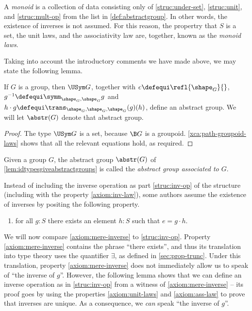 \begin{remark}
  A \emph{monoid} is a collection of data consisting only of \ref{struc:under-set}, \ref{struc:unit}, and \ref{struc:mult-op} from the list in
  \cref{def:abstractgroup}.  In other words, the existence of inverses is not assumed.  For this reason, the propertry that $S$ is a set, the
  unit laws, and the associativity law are, together, known as the \emph{monoid laws}.
\end{remark}

Taking into account the introductory comments we have made above, we may state the following lemma.

\begin{lemma}\label{lem:idtypesgiveabstractgroups}
  If $G$ is a group, then $\USym G$,
  together with $e\defequi\refl{\shape_G}{}$,
  $g^{-1}\defequi\symm_{\shape_G,\shape_G}g$
  and $h \cdot g \defequi \trans_{\shape_G,\shape_G,\shape_G}(g)(h)$, define an abstract group.
  We will let $\abstr(G)$ denote that abstract group.
\end{lemma}

\begin{proof}
  The type $\USym G$ is a set, because $\B G$ is a groupoid.
  \cref{xca:path-groupoid-laws} shows that all the relevant equations hold, as required.
\end{proof}

\begin{definition}\label{def:abstrG}
  Given a group $G$, the abstract group $\abstr(G)$ of \cref{lem:idtypesgiveabstractgroups} is called the \emph{abstract group associated to $G$}.
\end{definition}

\begin{remark}\label{rem:inverses-as-property}
  \makeatletter %
  \renewcommand\p@enumii{}%
  \makeatother%
  Instead of including the inverse operation as part
  \ref{struc:inv-op} of the structure (including with the property
  \ref{axiom:inv-law}), some authors assume the existence of inverses
  by positing the following property.
  \begin{enumerate}[resume*]
    \item\label{axiom:mere-inverse} for all $g:S$ there exists an element
    $h:S$ such that $e = g \cdot h$.
  \end{enumerate}

  We will now compare \ref{axiom:mere-inverse} to \ref{struc:inv-op}.
  Property \ref{axiom:mere-inverse} contains the phrase ``there exists'', and thus its translation into type theory
  uses the quantifier $\exists$, as defined in \cref{sec:prop-trunc}.  Under this translation, property \ref{axiom:mere-inverse} does
  not immediately allow us to speak of ``the inverse of $g$''.
  However, the following lemma shows that we can define an inverse operation as in \ref{struc:inv-op} from a witness of \ref{axiom:mere-inverse}
  -- its proof goes by using the properties \ref{axiom:unit-laws} and \ref{axiom:ass-law} to prove that inverses are unique.  As a consequence,
  we \emph{can} speak ``the inverse of $g$''.
\end{remark}

